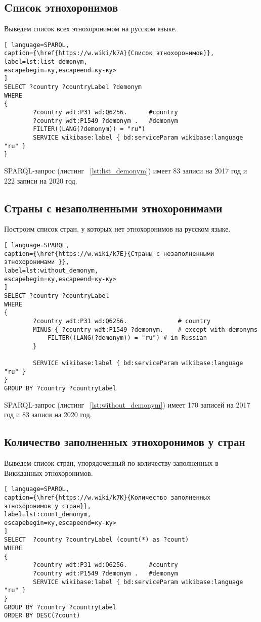 \subsection{Cписок этнохоронимов}

Выведем список всех этнохоронимом на русском языке.

\begin{lstlisting}[ language=SPARQL, 
caption={\href{https://w.wiki/k7A}{Cписок этнохоронимов}},
label=lst:list_demonym, 
escapebegin=ку,escapeend=ку-ку>
]
SELECT ?country ?countryLabel ?demonym
WHERE
{
		?country wdt:P31 wd:Q6256.      #country
		?country wdt:P1549 ?demonym .   #demonym
		FILTER((LANG(?demonym)) = "ru")
		SERVICE wikibase:label { bd:serviceParam wikibase:language "ru" }
}
\end{lstlisting}

SPARQL-запрос  (листинг ~\ref{lst:list_demonym}) имеет 83 записи на 2017 год и 222 записи на 2020 год.

\subsection{Страны с незаполненными этнохоронимами}

Построим список стран, у которых нет этнохоронимов на русском языке.

\begin{lstlisting}[ language=SPARQL, 
caption={\href{https://w.wiki/k7E}{Страны с незаполненными этнохоронимами }},
label=lst:without_demonym, 
escapebegin=ку,escapeend=ку-ку>
]
SELECT ?country ?countryLabel 
WHERE
{
		?country wdt:P31 wd:Q6256.              # country
		MINUS { ?country wdt:P1549 ?demonym.    # except with demonyms
			FILTER((LANG(?demonym)) = "ru") # in Russian
		}    

		SERVICE wikibase:label { bd:serviceParam wikibase:language "ru" }
}
GROUP BY ?country ?countryLabel
\end{lstlisting}

SPARQL-запрос  (листинг ~\ref{lst:without_demonym}) имеет 170 записей на 2017 год и 83 записи на 2020 год.

\subsection{Количество заполненных этнохоронимов у стран}

Выведем список стран, упорядоченный по количеству заполненных в Викиданных этнохоронимов.

\begin{lstlisting}[ language=SPARQL, 
caption={\href{https://w.wiki/k7K}{Количество заполненных этнохоронимов у стран}},
label=lst:count_demonym, 
escapebegin=ку,escapeend=ку-ку>
]
SELECT  ?country ?countryLabel (count(*) as ?count)
WHERE
{
		?country wdt:P31 wd:Q6256.      #country
		?country wdt:P1549 ?demonym .   #demonym
		SERVICE wikibase:label { bd:serviceParam wikibase:language "ru" }
}
GROUP BY ?country ?countryLabel 
ORDER BY DESC(?count)
\end{lstlisting}

